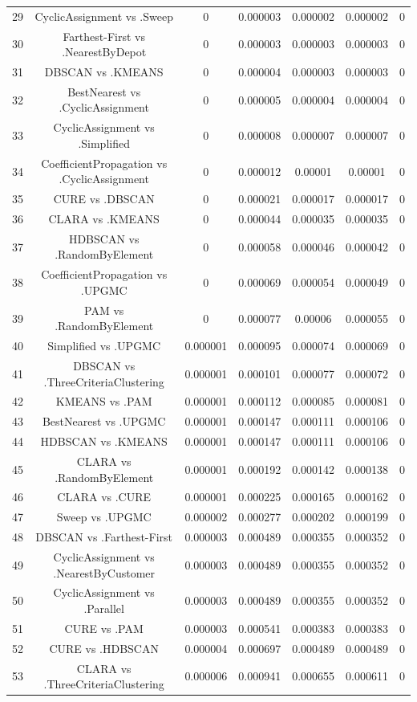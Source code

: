 \documentclass[a4paper,10pt]{article}
\begin{document}
\begin{landscape}
\begin{table}[!htp]
\begin{tabular}{ccccccc}
29&CyclicAssignment vs .Sweep&0&0.000003&0.000002&0.000002&0\\
30&Farthest-First vs .NearestByDepot&0&0.000003&0.000003&0.000003&0\\
31&DBSCAN vs .KMEANS&0&0.000004&0.000003&0.000003&0\\
32&BestNearest vs .CyclicAssignment&0&0.000005&0.000004&0.000004&0\\
33&CyclicAssignment vs .Simplified&0&0.000008&0.000007&0.000007&0\\
34&CoefficientPropagation vs .CyclicAssignment&0&0.000012&0.00001&0.00001&0\\
35&CURE vs .DBSCAN&0&0.000021&0.000017&0.000017&0\\
36&CLARA vs .KMEANS&0&0.000044&0.000035&0.000035&0\\
37&HDBSCAN vs .RandomByElement&0&0.000058&0.000046&0.000042&0\\
38&CoefficientPropagation vs .UPGMC&0&0.000069&0.000054&0.000049&0\\
39&PAM vs .RandomByElement&0&0.000077&0.00006&0.000055&0\\
40&Simplified vs .UPGMC&0.000001&0.000095&0.000074&0.000069&0\\
41&DBSCAN vs .ThreeCriteriaClustering&0.000001&0.000101&0.000077&0.000072&0\\
42&KMEANS vs .PAM&0.000001&0.000112&0.000085&0.000081&0\\
43&BestNearest vs .UPGMC&0.000001&0.000147&0.000111&0.000106&0\\
44&HDBSCAN vs .KMEANS&0.000001&0.000147&0.000111&0.000106&0\\
45&CLARA vs .RandomByElement&0.000001&0.000192&0.000142&0.000138&0\\
46&CLARA vs .CURE&0.000001&0.000225&0.000165&0.000162&0\\
47&Sweep vs .UPGMC&0.000002&0.000277&0.000202&0.000199&0\\
48&DBSCAN vs .Farthest-First&0.000003&0.000489&0.000355&0.000352&0\\
49&CyclicAssignment vs .NearestByCustomer&0.000003&0.000489&0.000355&0.000352&0\\
50&CyclicAssignment vs .Parallel&0.000003&0.000489&0.000355&0.000352&0\\
51&CURE vs .PAM&0.000003&0.000541&0.000383&0.000383&0\\
52&CURE vs .HDBSCAN&0.000004&0.000697&0.000489&0.000489&0\\
53&CLARA vs .ThreeCriteriaClustering&0.000006&0.000941&0.000655&0.000611&0\\

\end{tabular}
\end{table}
\end{landscape}
\end{document}
